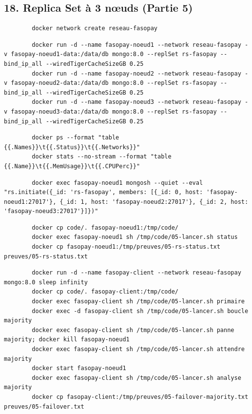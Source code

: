 \documentclass[11pt,a4paper]{article}
\begin{document}
	\subsection*{18. Replica Set à 3 nœuds (Partie 5)}
	\begin{lstlisting}
		docker network create reseau-fasopay
	\end{lstlisting}
	\begin{lstlisting}
		docker run -d --name fasopay-noeud1 --network reseau-fasopay -v fasopay-noeud1-data:/data/db mongo:8.0 --replSet rs-fasopay --bind_ip_all --wiredTigerCacheSizeGB 0.25
		docker run -d --name fasopay-noeud2 --network reseau-fasopay -v fasopay-noeud2-data:/data/db mongo:8.0 --replSet rs-fasopay --bind_ip_all --wiredTigerCacheSizeGB 0.25
		docker run -d --name fasopay-noeud3 --network reseau-fasopay -v fasopay-noeud3-data:/data/db mongo:8.0 --replSet rs-fasopay --bind_ip_all --wiredTigerCacheSizeGB 0.25
	\end{lstlisting}
	\begin{lstlisting}
		docker ps --format "table {{.Names}}\t{{.Status}}\t{{.Networks}}"
		docker stats --no-stream --format "table {{.Name}}\t{{.MemUsage}}\t{{.CPUPerc}}"
	\end{lstlisting}
	\begin{lstlisting}
		docker exec fasopay-noeud1 mongosh --quiet --eval "rs.initiate({_id: 'rs-fasopay', members: [{_id: 0, host: 'fasopay-noeud1:27017'}, {_id: 1, host: 'fasopay-noeud2:27017'}, {_id: 2, host: 'fasopay-noeud3:27017'}]})"
	\end{lstlisting}
	\begin{lstlisting}
		docker cp code/. fasopay-noeud1:/tmp/code/
		docker exec fasopay-noeud1 sh /tmp/code/05-lancer.sh status
		docker cp fasopay-noeud1:/tmp/preuves/05-rs-status.txt preuves/05-rs-status.txt
	\end{lstlisting}
	\begin{lstlisting}
		docker run -d --name fasopay-client --network reseau-fasopay mongo:8.0 sleep infinity
		docker cp code/. fasopay-client:/tmp/code/
		docker exec fasopay-client sh /tmp/code/05-lancer.sh primaire
		docker exec -d fasopay-client sh /tmp/code/05-lancer.sh boucle majority
		docker exec fasopay-client sh /tmp/code/05-lancer.sh panne majority; docker kill fasopay-noeud1
		docker exec fasopay-client sh /tmp/code/05-lancer.sh attendre majority
		docker start fasopay-noeud1
		docker exec fasopay-client sh /tmp/code/05-lancer.sh analyse majority
		docker cp fasopay-client:/tmp/preuves/05-failover-majority.txt preuves/05-failover.txt
	\end{lstlisting}
\end{document}

